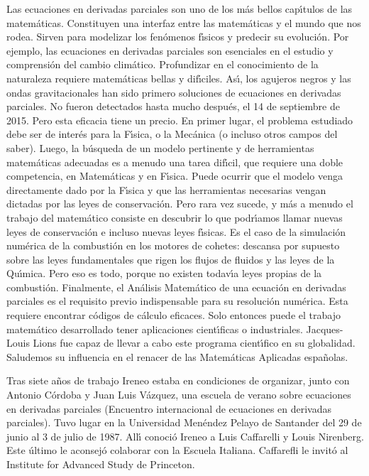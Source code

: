 Las ecuaciones en derivadas parciales son uno de los m\'as bellos cap{\'\i}tulos de las matem\'aticas. Constituyen una interfaz entre las matem\'aticas y el mundo que nos rodea. Sirven para modelizar los fen\'omenos f{\'\i}sicos y predecir su evoluci\'on. Por ejemplo, las ecuaciones en derivadas parciales son esenciales en el estudio y comprensi\'on del cambio clim\'atico. Profundizar en el conocimiento de la naturaleza requiere matem\'aticas bellas y dif{\'\i}ciles. As{\'\i}, los agujeros negros y las ondas gravitacionales han sido primero soluciones de ecuaciones en derivadas parciales. No  fueron   detectados hasta mucho despu\'es, el 14 de septiembre de 2015. Pero esta eficacia tiene un precio. En primer lugar, el problema estudiado debe ser de inter\'es para la F{\'\i}sica, o la Mec\'anica (o incluso otros campos del saber). Luego, la b\'usqueda de un modelo pertinente y de herramientas matem\'aticas adecuadas es a menudo una tarea dif{\'\i}cil, que requiere una doble competencia, en Matem\'aticas y en F{\'\i}sica. Puede ocurrir que el modelo venga directamente dado  por la F{\'\i}sica y que las herramientas necesarias vengan dictadas por las leyes de conservaci\'on. Pero rara vez sucede, y m\'as a menudo el trabajo del matem\'atico consiste en descubrir lo que podr{\'\i}amos llamar nuevas leyes de conservaci\'on e incluso nuevas leyes f{\'\i}sicas. Es el caso de la simulaci\'on num\'erica de la combusti\'on en los motores de cohetes: descansa por supuesto sobre las leyes fundamentales que rigen los flujos de fluidos y las leyes de la Qu{\'\i}mica. Pero eso es todo, porque no existen todav{\'\i}a leyes propias de la combusti\'on. Finalmente, el An\'alisis Matem\'atico de una ecuaci\'on en derivadas parciales es el requisito previo indispensable para su resoluci\'on num\'erica. Esta 
 requiere encontrar c\'odigos de c\'alculo eficaces. Solo entonces puede el trabajo  matem\'atico desarrollado tener aplicaciones cient{\'\i}ficas o industriales. Jacques-Louis Lions fue capaz de llevar a cabo este programa cient{\'\i}fico en su globalidad. Saludemos su influencia en el renacer de las Matem\'aticas Aplicadas espa\~nolas.
 
 
 
Tras siete a\~nos de trabajo Ireneo estaba  en condiciones de organizar, junto con Antonio C\'ordoba y Juan Luis V\'azquez, una escuela de verano sobre ecuaciones en derivadas parciales (Encuentro internacional de ecuaciones en derivadas parciales). Tuvo lugar  en la Universidad Men\'endez Pelayo de Santander del 29 de junio al 3 de julio de 1987. All{\'\i} conoci\'o Ireneo a Luis Caffarelli y Louis Nirenberg. Este \'ultimo le aconsej\'o colaborar con la Escuela Italiana. Caffarefli le 
invit\'o al Institute for Advanced Study de Princeton.



